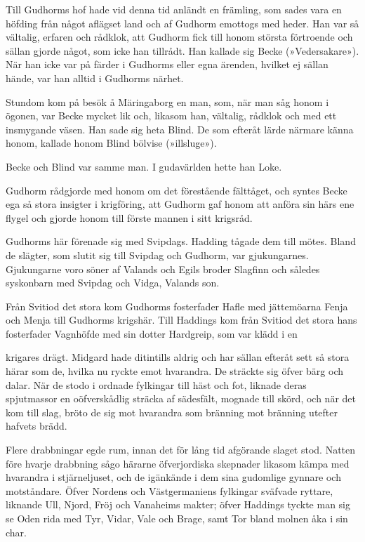 Till Gudhorms hof hade vid denna tid anländt en främling, som sades vara
en höfding från något aflägset land och af Gudhorm emottogs med heder.
Han var så vältalig, erfaren och rådklok, att Gudhorm fick till honom
största förtroende och sällan gjorde något, som icke han tillrådt. Han
kallade sig Becke (»Vedersakare»). När han icke var på färder i Gudhorms
eller egna ärenden, hvilket ej sällan hände, var han alltid i Gudhorms
närhet.

Stundom kom på besök å Märingaborg en man, som, när man såg honom i
ögonen, var Becke mycket lik och, likasom han, vältalig, rådklok och med
ett insmygande väsen. Han sade sig heta Blind. De som efteråt lärde
närmare känna honom, kallade honom Blind bölvise (»illsluge»).

Becke och Blind var samme man. I gudavärlden hette han Loke.

Gudhorm rådgjorde med honom om det förestående fälttåget, och syntes
Becke ega så stora insigter i krigföring, att Gudhorm gaf honom att
anföra sin härs ene flygel och gjorde honom till förste mannen i sitt
krigsråd.

Gudhorms här förenade sig med Svipdags. Hadding tågade dem till mötes.
Bland de slägter, som slutit sig till Svipdag och Gudhorm, var
gjukungarnes. Gjukungarne voro söner af Valands och Egils broder
Slagfinn och således syskonbarn med Svipdag och Vidga, Valands son.

Från Svitiod det stora kom Gudhorms fosterfader Hafle med jättemöarna
Fenja och Menja till Gudhorms krigshär. Till Haddings kom från Svitiod
det stora hans fosterfader Vagnhöfde med sin dotter Hardgreip, som var
klädd i en

krigares drägt. Midgard hade ditintills aldrig och har sällan efteråt
sett så stora härar som de, hvilka nu ryckte emot hvarandra. De sträckte
sig öfver bärg och dalar. När de stodo i ordnade fylkingar till häst och
fot, liknade deras spjutmassor en oöfverskådlig sträcka af sädesfält,
mognade till skörd, och när det kom till slag, bröto de sig mot
hvarandra som bränning mot bränning utefter hafvets brädd.

Flere drabbningar egde rum, innan det för lång tid afgörande slaget
stod. Natten före hvarje drabbning sågo härarne öfverjordiska skepnader
likasom kämpa med hvarandra i stjärneljuset, och de igänkände i dem sina
gudomlige gynnare och motståndare. Öfver Nordens och Västgermaniens
fylkingar sväfvade ryttare, liknande Ull, Njord, Fröj och Vanaheims
makter; öfver Haddings tyckte man sig se Oden rida med Tyr, Vidar, Vale
och Brage, samt Tor bland molnen åka i sin char.

